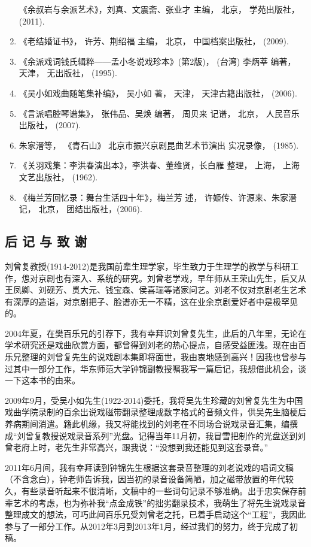 \begin{enumerate}
  《余叔岩与余派艺术》，刘真、文震斋、张业才 主编， 北京，
  学苑出版社，(2011).
\item
  《老结婚证书》， 许芳、荆绍福 主编， 北京， 中国档案出版社， (2009).
\item
  《余派戏词钱氏辑粹------孟小冬说戏珍本》(第2版)， (台湾) 李炳莘 编著，
  天津， 无出版社， (1995).
\item
  《吴小如戏曲随笔集补编》， 吴小如 著， 天津， 天津古籍出版社， (2006).
\item
  《言派唱腔琴谱集》， 张伟品、吴焕 编著， 周贝来 记谱， 北京，
  人民音乐出版社， (2007).
\item
  朱家溍等， 《青石山》 北京市振兴京剧昆曲艺术节演出 实况录像， (1985).
\item
  《关羽戏集：李洪春演出本》，李洪春、董维贤，长白雁 整理， 上海，
  上海文艺出版社， (1962).
\item
  《梅兰芳回忆录：舞台生活四十年》，梅兰芳 述， 许姬传、许源来、朱家溍
  记， 北京， 团结出版社，(2006).
\end{enumerate}

\hypertarget{ux540e-ux8bb0-ux4e0e-ux81f4-ux8c22}{%
\subsection{后 记 与 致 谢}\label{ux540e-ux8bb0-ux4e0e-ux81f4-ux8c22}}

刘曾复教授(1914-2012)是我国前辈生理学家，毕生致力于生理学的教学与科研工作，怹对京剧也有深入、系统的研究。刘曾老学戏，早年师从王荣山先生，后又从王凤卿、刘砚芳、贯大元、钱宝森、侯喜瑞等诸家问艺。刘老不仅对京剧老生艺术有深厚的造诣，对京剧把子、脸谱亦无一不精，这在业余京剧爱好者中是极罕见的。

2004年夏，在樊百乐兄的引荐下，我有幸拜识刘曾复先生，此后的八年里，无论在学术研究还是戏曲欣赏方面，都曾得到刘老的热心提点，自感受益匪浅。现在由百乐兄整理的刘曾复先生的说戏剧本集即将面世，我由衷地感到高兴！因我也曾参与过其中一部分工作，华东师范大学钟锦副教授嘱我写一篇后记，我想借此机会，谈一下这本书的由来。

2009年9月，受吴小如先生(1922-2014)委托，我将吴先生珍藏的刘曾复先生为中国戏曲学院录制的百余出说戏磁带翻录整理成数字格式的音频文件，供吴先生脑梗后养病期间消遣。籍此机缘，我又将能找到的刘老在不同场合说戏录音汇集，编撰成``刘曾复教授说戏录音系列''光盘。记得当年11月初，我冒雪把制作的光盘送到刘曾老府上时，老先生非常高兴，跟我说：``没想到我还能见到这套录音。''

2011年6月间，我有幸拜读到钟锦先生根据这套录音整理的刘老说戏的唱词文稿（不含念白），钟老师告诉我，因当初的录音设备简陋，加之磁带放置的年代较久，有些录音听起来不很清晰，文稿中的一些词句记录不够准确。出于忠实保存前辈艺术的考虑，也为弥补我``点金成铁''的拙劣翻录技术，我萌生了将先生说戏录音整理成文的想法，可巧此间百乐兄受刘曾老之托，已着手启动这个``工程''，我因此参与了一部分工作。从2012年3月到2013年1月，经过我们的努力，终于完成了初稿。

